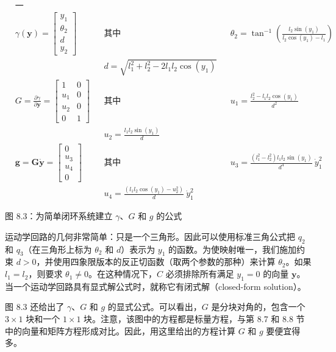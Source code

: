 \documentclass[10pt,a4paper]{book}
\theoremstyle{thmstyle} %
\theoremstyle{defstyle} %
\theoremstyle{prostyle} %
\begin{document}
$$
\begin{aligned}&\text{一}\\&\gamma(\boldsymbol{y})=\begin{bmatrix}y_1\\\theta_2\\d\\y_2\end{bmatrix}&&\text{其中}&&\theta_2=\tan^{-1}\left(\frac{l_2\sin(y_1)}{l_2\cos(y_1)-l_1}\right)\\&&&d=\sqrt{l_1^2+l_2^2-2l_1l_2\cos(y_1)}\\&G=\frac{\partial\gamma}{\partial\boldsymbol{y}}=\begin{bmatrix}1&0\\u_1&0\\u_2&0\\0&1\end{bmatrix}&&\text{其中}&&u_1=\frac{l_2^2-l_1l_2\cos(y_1)}{d^2}\\&&&u_2=\frac{l_1l_2\sin(y_1)}{d}\\&\boldsymbol{g}=\boldsymbol{G}\dot{\boldsymbol{y}}=\begin{bmatrix}0\\u_3\\u_4\\0\end{bmatrix}&&\text{其中}&&u_3=\frac{(l_1^2-l_2^2)l_1l_2\sin(y_1)}{d^4}\:\dot{y}_1^2\\&&&u_4=\frac{(l_1l_2\cos(y_1)-u_2^2)}{d}\:\dot{y}_1^2\end{aligned}
$$



图 8.3：为简单闭环系统建立 $\gamma$、$G$ 和 $g$ 的公式



运动学回路的几何非常简单：只是一个三角形。因此可以使用标准三角公式把 $q_2$ 和 $q_3$（在三角形上标为 $\theta_2$ 和 $d$）表示为 $y_1$ 的函数。为使映射唯一，我们施加约束 $d > 0$，并使用四象限版本的反正切函数（取两个参数的那种）来计算 $\theta_2$。如果 $l_1 = l_2$，则要求 $\theta_1 \neq 0$。在这种情况下，$C$ 必须排除所有满足 $y_1 = 0$ 的向量 $\mathbf{y}$。当一个运动学回路具有显式解公式时，就称它有闭式解（closed-form solution）。



图 8.3 还给出了 $\gamma$、$G$ 和 $g$ 的显式公式。可以看出，$G$ 是分块对角的，包含一个 $3 \times 1$ 块和一个 $1 \times 1$ 块。注意，该图中的方程都是标量方程，与第 8.7 和 8.8 节中的向量和矩阵方程形成对比。因此，用这里给出的方程计算 $G$ 和 $g$ 要便宜得多。
\end{document}
